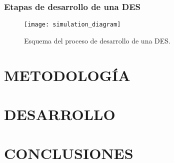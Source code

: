 \subsubsection{Etapas de desarrollo de una DES}

\begin{figure}
    \begin{center}
        \texttt{[image: simulation\_diagram]}
    \end{center}
    \caption{Esquema del proceso de desarrollo de una DES.}
    \label{fig:simulation_diagram}
\end{figure}


\section{METODOLOGÍA}
\section{DESARROLLO}
\section{CONCLUSIONES}

\newpage 




